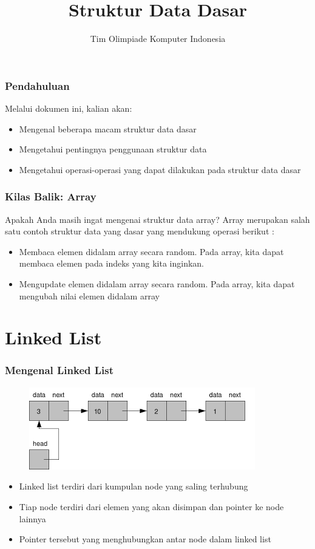 

\title{Struktur Data Dasar}
\author{Tim Olimpiade Komputer Indonesia}
\date{}



\begin{frame}
\titlepage
\end{frame}

\begin{frame}
\frametitle{Pendahuluan}
Melalui dokumen ini, kalian akan:
\begin{itemize}
	\item Mengenal beberapa macam struktur data dasar
	\item Mengetahui pentingnya penggunaan struktur data
	\item Mengetahui operasi-operasi yang dapat dilakukan pada struktur data dasar
\end{itemize}
\end{frame}

\begin{frame}
\frametitle{Kilas Balik: Array}
Apakah Anda masih ingat mengenai struktur data array?
Array merupakan salah satu contoh struktur data yang dasar yang mendukung operasi berikut :
\begin{itemize}
	\item Membaca elemen didalam array secara random. Pada array, kita dapat membaca elemen pada indeks yang kita inginkan.
	\item Mengupdate elemen didalam array secara random. Pada array, kita dapat mengubah nilai elemen didalam array
\end{itemize} 
\end{frame}

\section{Linked List}
\frame{\sectionpage}

\begin{frame}
\frametitle{Mengenal Linked List}
\begin{figure}
	\centering
	\includegraphics[width=6 cm]{asset/linkedlist.png}
\end{figure}
\begin{itemize}
	\item Linked list terdiri dari kumpulan \alert{node} yang saling terhubung
	\item Tiap node terdiri dari elemen yang akan disimpan dan \alert{pointer} ke node lainnya
	\item Pointer tersebut yang menghubungkan antar node dalam linked list
\end{itemize}
\end{frame}

